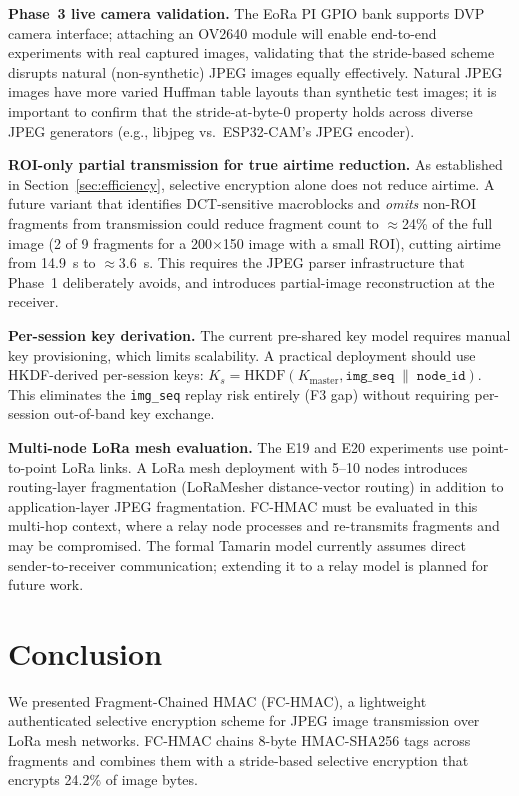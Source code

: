 \documentclass[journal]{IEEEtran}
\begin{document}
\textbf{Phase~3 live camera validation.}  The EoRa PI GPIO bank supports DVP
camera interface; attaching an OV2640 module will enable end-to-end experiments
with real captured images, validating that the stride-based scheme disrupts
natural (non-synthetic) JPEG images equally effectively.  Natural JPEG images
have more varied Huffman table layouts than synthetic test images; it is
important to confirm that the stride-at-byte-0 property holds across diverse
JPEG generators (e.g., libjpeg vs.\ ESP32-CAM's JPEG encoder).

\textbf{ROI-only partial transmission for true airtime reduction.}
As established in Section~\ref{sec:efficiency}, selective encryption alone does
not reduce airtime.  A future variant that identifies DCT-sensitive macroblocks
and \emph{omits} non-ROI fragments from transmission could reduce fragment count
to $\approx$24\% of the full image (2 of 9 fragments for a 200$\times$150 image
with a small ROI), cutting airtime from 14.9~s to $\approx$3.6~s.  This
requires the JPEG parser infrastructure that Phase~1 deliberately avoids, and
introduces partial-image reconstruction at the receiver.

\textbf{Per-session key derivation.}  The current pre-shared key model requires
manual key provisioning, which limits scalability.  A practical deployment
should use HKDF-derived per-session keys: $K_s = \mathrm{HKDF}(K_{\text{master}},
\texttt{img\_seq} \;\|\; \texttt{node\_id})$.  This eliminates the
\texttt{img\_seq} replay risk entirely (F3 gap) without requiring per-session
out-of-band key exchange.

\textbf{Multi-node LoRa mesh evaluation.}  The E19 and E20 experiments use
point-to-point LoRa links.  A LoRa mesh deployment with 5--10 nodes introduces
routing-layer fragmentation (LoRaMesher distance-vector routing) in addition to
application-layer JPEG fragmentation.  FC-HMAC must be evaluated in this
multi-hop context, where a relay node processes and re-transmits fragments and
may be compromised.  The formal Tamarin model currently assumes direct sender-to-receiver
communication; extending it to a relay model is planned for future work.

\section{Conclusion}
\label{sec:conclusion}

We presented Fragment-Chained HMAC (FC-HMAC), a lightweight authenticated
selective encryption scheme for JPEG image transmission over LoRa mesh networks.
FC-HMAC chains 8-byte HMAC-SHA256 tags across fragments and combines them with
a stride-based selective encryption that encrypts 24.2\% of image bytes.
\end{document}
